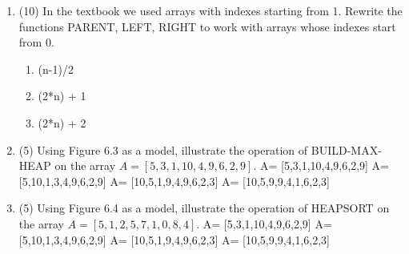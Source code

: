 \documentclass[12pt]{article}
\begin{document}
\begin{enumerate}
\item(10) In the textbook we used arrays with indexes starting from 1. Rewrite the functions PARENT, LEFT, RIGHT to work with arrays whose indexes start from 0.
\begin{enumerate}
\item 
\begin{algorithm}[H]
\begin{algorithmic}
  \State (n-1)/2
\EndProcedure
\end{algorithmic}
\end{algorithm}

\item
\begin{algorithm}[H]
\begin{algorithmic}
  \State (2*n) + 1
\EndProcedure
\end{algorithmic}
\end{algorithm}

\item
\begin{algorithm}[H]
\begin{algorithmic}
  \State (2*n) + 2
\EndProcedure
\end{algorithmic}
\end{algorithm}

\end{enumerate}

\item (5) Using Figure 6.3 as a model, illustrate the operation of BUILD-MAX-HEAP on the
array $A = [ 5, 3, 1, 10, 4, 9, 6, 2, 9]$. \newline
A= [5,3,1,10,4,9,6,2,9] \newline
A= [5,10,1,3,4,9,6,2,9] \newline
A= [10,5,1,9,4,9,6,2,3] \newline
A= [10,5,9,9,4,1,6,2,3]

\item (5) Using Figure 6.4 as a model, illustrate the operation of HEAPSORT on the array
$A = [5, 1, 2, 5, 7, 1, 0, 8, 4]$.\newline
A= [5,3,1,10,4,9,6,2,9] \newline
A= [5,10,1,3,4,9,6,2,9] \newline
A= [10,5,1,9,4,9,6,2,3] \newline
A= [10,5,9,9,4,1,6,2,3]


\end{enumerate}
\end{document}
